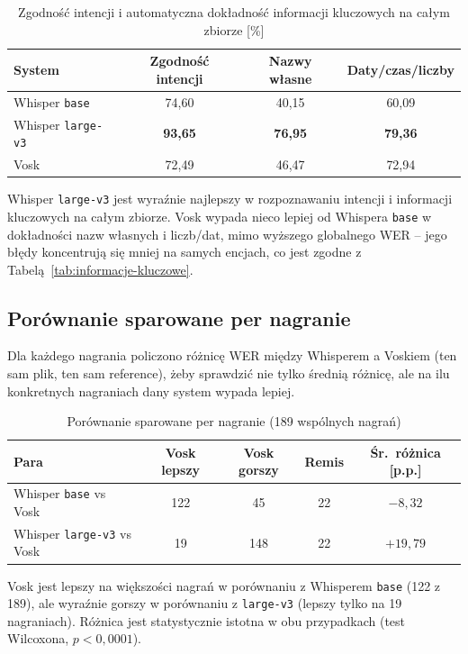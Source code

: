 \documentclass{article}
\begin{document}
\begin{table}[htbp]
\centering
\caption{Zgodność intencji i automatyczna dokładność informacji kluczowych na całym zbiorze [\%]}
\label{tab:intencje}
\begin{tabular}{lccc}
\toprule
\textbf{System} & \textbf{Zgodność intencji} & \textbf{Nazwy własne} & \textbf{Daty/czas/liczby} \\
\midrule
Whisper \texttt{base}     & 74,60 & 40,15 & 60,09 \\
Whisper \texttt{large-v3} & \textbf{93,65} & \textbf{76,95} & \textbf{79,36} \\
Vosk                     & 72,49 & 46,47 & 72,94 \\
\bottomrule
\end{tabular}
\end{table}

Whisper \texttt{large-v3} jest wyraźnie najlepszy w rozpoznawaniu intencji i
informacji kluczowych na całym zbiorze. Vosk wypada nieco lepiej od Whispera
\texttt{base} w dokładności nazw własnych i liczb/dat, mimo wyższego
globalnego WER -- jego błędy koncentrują się mniej na samych encjach, co jest
zgodne z Tabelą~\ref{tab:informacje-kluczowe}.

\subsection{Porównanie sparowane per nagranie}

Dla każdego nagrania policzono różnicę WER między Whisperem a Voskiem (ten
sam plik, ten sam reference), żeby sprawdzić nie tylko średnią różnicę, ale
na ilu konkretnych nagraniach dany system wypada lepiej.

\begin{table}[htbp]
\centering
\caption{Porównanie sparowane per nagranie (189 wspólnych nagrań)}
\label{tab:parowane}
\begin{tabular}{lcccc}
\toprule
\textbf{Para} & \textbf{Vosk lepszy} & \textbf{Vosk gorszy} & \textbf{Remis} & \textbf{Śr.\ różnica [p.p.]} \\
\midrule
Whisper \texttt{base} vs Vosk     & 122 & 45  & 22 & $-8{,}32$ \\
Whisper \texttt{large-v3} vs Vosk & 19  & 148 & 22 & $+19{,}79$ \\
\bottomrule
\end{tabular}
\end{table}

Vosk jest lepszy na większości nagrań w porównaniu z Whisperem
\texttt{base} (122 z 189), ale wyraźnie gorszy w porównaniu z
\texttt{large-v3} (lepszy tylko na 19 nagraniach). Różnica jest statystycznie
istotna w obu przypadkach (test Wilcoxona, $p < 0{,}0001$).
\end{document}
